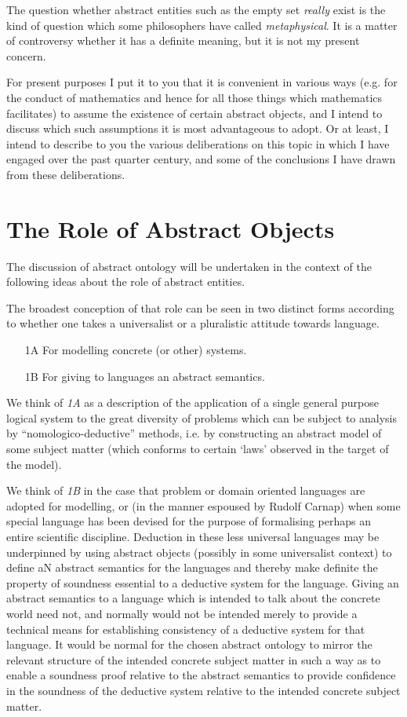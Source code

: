 \documentclass[numreferences]{book}
\begin{document}
The question whether abstract entities such as the empty set {\it really} exist is the kind of question which some philosophers have called  {\it metaphysical}.
It is a matter of controversy whether it has a definite meaning, but it is not my present concern.

For present purposes I put it to you that it is convenient in various ways (e.g. for the conduct of mathematics and hence for all those things which mathematics facilitates) to assume the existence of certain abstract objects, and I intend to discuss which such assumptions it is most advantageous to adopt.
Or at least, I intend to describe to you the various deliberations on this topic in which I have engaged over the past quarter century, and some of the conclusions I have drawn from these deliberations.

\section{The Role of Abstract Objects}

The discussion of abstract ontology will be undertaken in the context of the following ideas about the role of abstract entities.

The broadest conception of that role can be seen in two distinct forms according to whether one takes a universalist or a pluralistic attitude towards language.

\begin{itemize}
\item[1A] For modelling concrete (or other) systems.
\item[1B] For giving to languages an abstract semantics.
\end{itemize}

We think of \emph{1A} as a description of the application of a single general purpose logical system to the great diversity of problems which can be subject to analysis by ``nomologico-deductive'' methods, i.e. by constructing an abstract model of some subject matter (which conforms to certain `laws' observed in the target of the model).

We think of \emph{1B} in the case that problem or domain oriented languages are adopted for modelling, or (in the manner espoused by Rudolf Carnap) when some special language has been devised for the purpose of formalising perhaps an entire scientific discipline.
Deduction in these less universal languages may be underpinned by using abstract objects (possibly in some universalist context) to define aN abstract semantics for the languages and thereby make definite the property of soundness essential to a deductive system for the language.
Giving an abstract semantics to a language which is intended to talk about the concrete world need not, and normally would not be intended merely to provide a technical means for establishing consistency of a deductive system for that language.
It would be normal for the chosen abstract ontology to mirror the relevant structure of the intended concrete subject matter in such a way as to enable a soundness proof relative to the abstract semantics to provide confidence in the soundness of the deductive system relative to the intended concrete subject matter.
\end{document}
